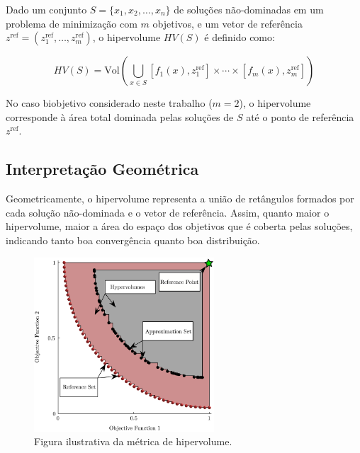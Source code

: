 \documentclass[
	12pt,				%
	oneside,			%
	a4paper,			%
	chapter=TITLE,
	sumario=tradicional,
	english,			%
	brazil				%
]{abntex2}
\begin{document}
Dado um conjunto $S = \{x_1, x_2, \dots, x_n\}$ de soluções não-dominadas em um problema de minimização com $m$ objetivos, e um vetor de
referência $z^{\text{ref}} = (z_1^{\text{ref}}, \dots, z_m^{\text{ref}})$, o hipervolume $HV(S)$ é definido como:

\begin{equation}
HV(S) = \text{Vol} \left( \bigcup_{x \in S} [f_1(x), z_1^{\text{ref}}] \times \cdots \times [f_m(x), z_m^{\text{ref}}] \right)
\end{equation}

No caso biobjetivo considerado neste trabalho ($m = 2$), o hipervolume corresponde à área total dominada pelas soluções de $S$ até o
ponto de referência $z^{\text{ref}}$.

\subsection{Interpretação Geométrica}

Geometricamente, o hipervolume representa a união de retângulos formados por cada solução não-dominada e o vetor de referência.
Assim, quanto maior o hipervolume, maior a área do espaço dos objetivos que é coberta pelas soluções, indicando tanto boa convergência quanto boa distribuição.

\begin{figure}[h!]
	\caption{\label{fig:hypervolume}Figura ilustrativa da métrica de hipervolume.}
	\begin{center}
    \includegraphics[width=0.6\textwidth,clip]{Illustration-hypervolume-metric.png}
	\end{center}
\end{figure}
\end{document}
